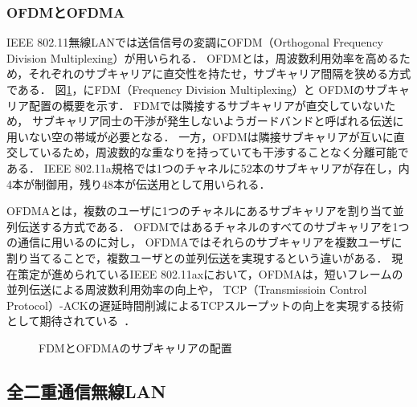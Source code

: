 \documentclass[master]{kuisthesis}		%
\begin{document}
		\subsubsection{OFDMとOFDMA}
			IEEE 802.11無線LANでは送信信号の変調にOFDM（Orthogonal Frequency Division Multiplexing）が用いられる．
			OFDMとは，周波数利用効率を高めるため，それぞれのサブキャリアに直交性を持たせ，サブキャリア間隔を狭める方式である．
			図\ref{fig:ofdm_ofdma}，にFDM（Frequency Division Multiplexing）と
			OFDMのサブキャリア配置の概要を示す．
			FDMでは隣接するサブキャリアが直交していないため，
			サブキャリア同士の干渉が発生しないようガードバンドと呼ばれる伝送に用いない空の帯域が必要となる．
			一方，OFDMは隣接サブキャリアが互いに直交しているため，周波数的な重なりを持っていても干渉することなく分離可能である．
			IEEE 802.11a規格では1つのチャネルに52本のサブキャリアが存在し，内4本が制御用，残り48本が伝送用として用いられる．
			\par
			OFDMAとは，複数のユーザに1つのチャネルにあるサブキャリアを割り当て並列伝送する方式である．
			OFDMではあるチャネルのすべてのサブキャリアを1つの通信に用いるのに対し，
			OFDMAではそれらのサブキャリアを複数ユーザに割り当てることで，複数ユーザとの並列伝送を実現するという違いがある．
			現在策定が進められているIEEE 802.11axにおいて，OFDMAは，短いフレームの並列伝送による周波数利用効率の向上や，
			TCP（Transmissioin Control Protocol）-ACKの遅延時間削減によるTCPスループットの向上を実現する技術として期待されている~\cite{ofdma}．

			\begin{figure}[t]
				\centering
				\hspace{20pt}
				\caption{FDMとOFDMAのサブキャリアの配置}
				\label{fig:ofdm_ofdma}
			\end{figure}
	\subsection{全二重通信無線LAN}
\end{document}
